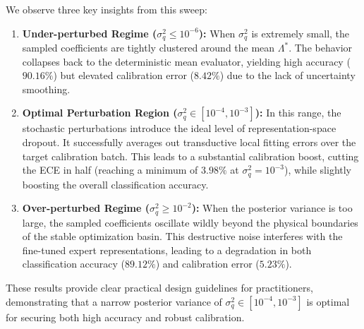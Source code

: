 \documentclass{article}
\theoremstyle{plain}
\theoremstyle{definition}
\theoremstyle{remark}
\begin{document}
\begin{table}[h]
\caption{\textbf{Sensitivity to Posterior Variance $\sigma_q^2$.} Classification accuracy and Expected Calibration Error (ECE) on physical SVHN as a function of the stochastically sampled posterior variance $\sigma_q^2$.}
\label{tab:sigma_q_sensitivity}
\vskip 0.1in
\begin{center}
\begin{small}
\end{small}
\end{center}
\vskip -0.1in
\end{table}

We observe three key insights from this sweep:
\begin{enumerate}
    \item \textbf{Under-perturbed Regime ($\sigma_q^2 \le 10^{-6}$):} When $\sigma_q^2$ is extremely small, the sampled coefficients are tightly clustered around the mean $\Lambda^*$. The behavior collapses back to the deterministic mean evaluator, yielding high accuracy ($90.16\%$) but elevated calibration error ($8.42\%$) due to the lack of uncertainty smoothing.
    \item \textbf{Optimal Perturbation Region ($\sigma_q^2 \in [10^{-4}, 10^{-3}]$):} In this range, the stochastic perturbations introduce the ideal level of representation-space dropout. It successfully averages out transductive local fitting errors over the target calibration batch. This leads to a substantial calibration boost, cutting the ECE in half (reaching a minimum of $3.98\%$ at $\sigma_q^2 = 10^{-3}$), while slightly boosting the overall classification accuracy.
    \item \textbf{Over-perturbed Regime ($\sigma_q^2 \ge 10^{-2}$):} When the posterior variance is too large, the sampled coefficients oscillate wildly beyond the physical boundaries of the stable optimization basin. This destructive noise interferes with the fine-tuned expert representations, leading to a degradation in both classification accuracy ($89.12\%$) and calibration error ($5.23\%$).
\end{enumerate}
These results provide clear practical design guidelines for practitioners, demonstrating that a narrow posterior variance of $\sigma_q^2 \in [10^{-4}, 10^{-3}]$ is optimal for securing both high accuracy and robust calibration.
\end{document}
